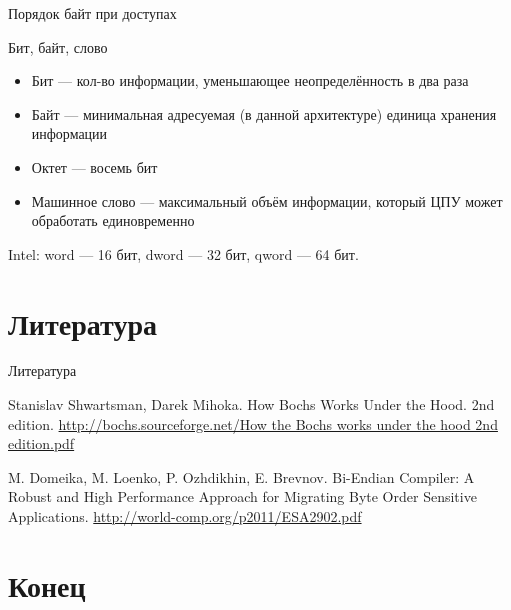 \documentclass{beamer}
\newcommand{\abbr}{\textit{англ.}\ }
\begin{document}
\begin{frame}{Порядок байт при доступах}



\end{frame}

\begin{frame}{Бит, байт, слово}
\begin{itemize}
\item Бит — кол-во информации, уменьшающее неопределённость в два раза\pause
\item Байт \pause — минимальная адресуемая (в данной архитектуре) единица хранения
информации \pause
\item Октет \pause — восемь бит \pause
\item Машинное слово \pause — максимальный объём информации, который ЦПУ может обработать единовременно
\end{itemize}

\pause
Intel: word — 16 бит, dword — 32 бит, qword — 64 бит.
\end{frame}



\section*{Литература}

\begin{frame}[allowframebreaks]{Литература}
\begin{thebibliography}{99}
     Stanislav Shwartsman, Darek Mihoka. How Bochs Works Under the Hood. 2nd edition.
    \url{http://bochs.sourceforge.net/How the Bochs works under the hood 2nd edition.pdf}
    
     M. Domeika, M. Loenko, P. Ozhdikhin, E. Brevnov.  Bi-Endian Compiler: A Robust and High Performance Approach for Migrating Byte Order Sensitive Applications.
    \url{http://world-comp.org/p2011/ESA2902.pdf}
\end{thebibliography}
\end{frame}

\section*{Конец}
\end{document}
